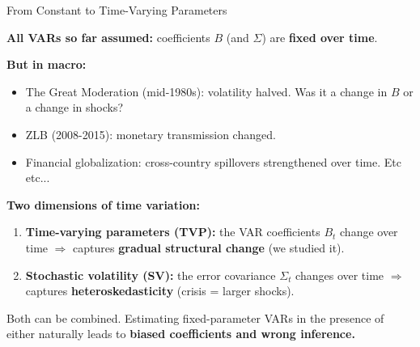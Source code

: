 \documentclass{beamer}
\begin{document}
\begin{frame}{From Constant to Time-Varying Parameters}
\small

\textbf{All VARs so far assumed:} coefficients $B$ (and $\Sigma$) are \textbf{fixed over time}.

\medskip
\textbf{But in macro:}
\begin{itemize}
  \item The Great Moderation (mid-1980s): volatility halved. Was it a change in $B$ or a change in shocks?
  \item ZLB (2008-2015): monetary transmission changed.
  \item Financial globalization: cross-country spillovers strengthened over time. Etc etc...
\end{itemize}

\pause
\medskip
\textbf{Two dimensions of time variation:}
\begin{enumerate}
  \item \textbf{Time-varying parameters (TVP):} the VAR coefficients $B_t$ change over time  $\Rightarrow$ captures \textbf{gradual structural change} (we studied it).
  \item \textbf{Stochastic volatility (SV):} the error covariance $\Sigma_t$ changes over time
        $\Rightarrow$ captures \textbf{heteroskedasticity} (crisis = larger shocks).
\end{enumerate}

\medskip
Both can be combined. Estimating fixed-parameter VARs in the presence of either naturally leads to \textbf{biased coefficients and wrong inference.}

\end{frame}
\end{document}

